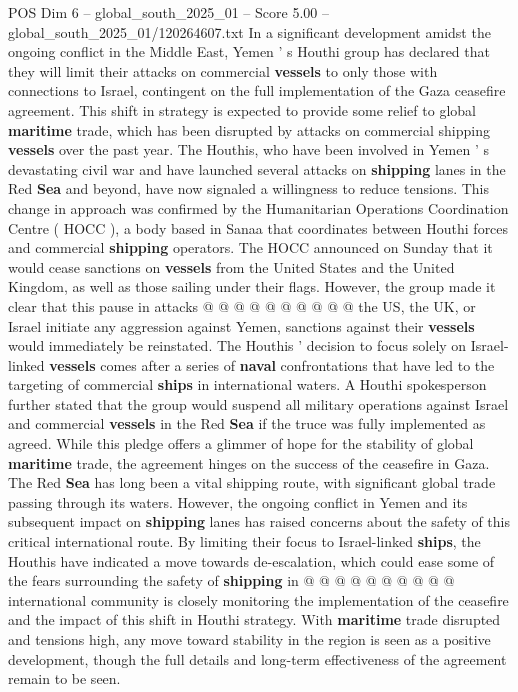 \begin{textsample}{POS Dim 6 – global\_south\_2025\_01 – Score 5.00 – global\_south\_2025\_01/120264607.txt}  \label{ex:f6_pos_440}
In a significant development amidst the ongoing conflict in the Middle East, Yemen ' s Houthi group has declared that they will limit their attacks on commercial \textbf{vessels} to only those with connections to Israel, contingent on the full implementation of the Gaza ceasefire agreement.
This shift in strategy is expected to provide some relief to global \textbf{maritime} trade, which has been disrupted by attacks on commercial shipping \textbf{vessels} over the past year.
The Houthis, who have been involved in Yemen ' s devastating civil war and have launched several attacks on \textbf{shipping} lanes in the Red \textbf{Sea} and beyond, have now signaled a willingness to reduce tensions.
This change in approach was confirmed by the Humanitarian Operations Coordination Centre ( HOCC ), a body based in Sanaa that coordinates between Houthi forces and commercial \textbf{shipping} operators.
The HOCC announced on Sunday that it would cease sanctions on \textbf{vessels} from the United States and the United Kingdom, as well as those sailing under their flags.
However, the group made it clear that this pause in attacks @ @ @ @ @ @ @ @ @ @ the US, the UK, or Israel initiate any aggression against Yemen, sanctions against their \textbf{vessels} would immediately be reinstated.
The Houthis ' decision to focus solely on Israel-linked \textbf{vessels} comes after a series of \textbf{naval} confrontations that have led to the targeting of commercial \textbf{ships} in international waters.
A Houthi spokesperson further stated that the group would suspend all military operations against Israel and commercial \textbf{vessels} in the Red \textbf{Sea} if the truce was fully implemented as agreed.
While this pledge offers a glimmer of hope for the stability of global \textbf{maritime} trade, the agreement hinges on the success of the ceasefire in Gaza.
The Red \textbf{Sea} has long been a vital shipping route, with significant global trade passing through its waters.
However, the ongoing conflict in Yemen and its subsequent impact on \textbf{shipping} lanes has raised concerns about the safety of this critical international route.
By limiting their focus to Israel-linked \textbf{ships}, the Houthis have indicated a move towards de-escalation, which could ease some of the fears surrounding the safety of \textbf{shipping} in @ @ @ @ @ @ @ @ @ @ international community is closely monitoring the implementation of the ceasefire and the impact of this shift in Houthi strategy.
With \textbf{maritime} trade disrupted and tensions high, any move toward stability in the region is seen as a positive development, though the full details and long-term effectiveness of the agreement remain to be seen.

\end{textsample}
